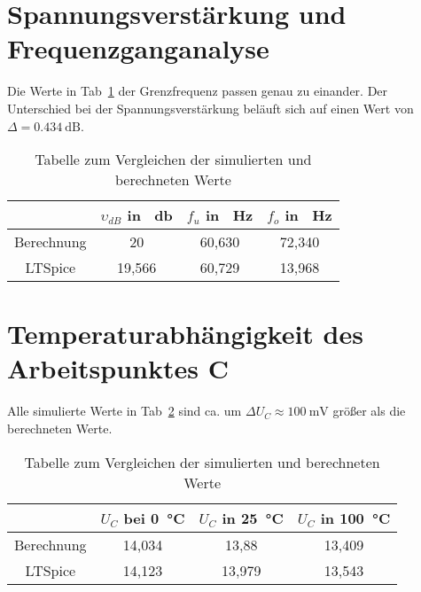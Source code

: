     \section{Spannungsverstärkung und Frequenzganganalyse}
        Die Werte in Tab~\ref{tab:frequenz} der Grenzfrequenz passen genau zu einander. Der Unterschied bei der Spannungsverstärkung  beläuft sich auf einen Wert von \(\Delta = \SI{0.434}{\dB}\).
        \begin{table}[h!]
            \centering
            \caption{Tabelle zum Vergleichen der simulierten und berechneten Werte}
            \begin{tabular}{| c | c | c | c |} 
                \hline
                & \(\upsilon_{dB}\) in \SI{}{\decibel} & \(f_u\) in \SI{}{\Hz}  & \(f_o\) in \SI{}{\Hz}  \\
                \hline
                Berechnung & 20 & 60,630 & 72,340 \\ 
                \hline
                LTSpice & 19,566 & 60,729 & 13,968 \\
                \hline
            \end{tabular}
            \label{tab:frequenz}
        \end{table}
    \section{Temperaturabhängigkeit des Arbeitspunktes C}
        Alle simulierte Werte in Tab~\ref{tab:temp} sind ca. um \(\Delta U_C\approx \SI{100}{\milli\volt}\) größer als die berechneten Werte.
        \begin{table}[h!]
            \centering
            \caption{Tabelle zum Vergleichen der simulierten und berechneten Werte}
            \begin{tabular}{| c | c | c | c |} 
                \hline
                & \(U_C\) bei \SI{0}{\degreeCelsius} & \(U_C\) in \SI{25}{\degreeCelsius}  & \(U_C\) in \SI{100}{\degreeCelsius}  \\
                \hline
                Berechnung & 14,034 & 13,88 & 13,409 \\ 
                \hline
                LTSpice & 14,123 & 13,979 & 13,543 \\
                \hline
            \end{tabular}
            \label{tab:temp}
        \end{table}
        
